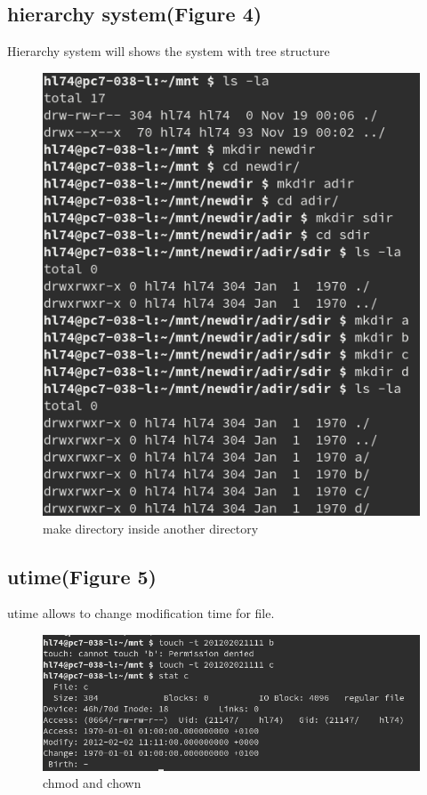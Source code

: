 \documentclass[legalpaper]{article}
\begin{document}
	\subsection*{hierarchy system(Figure 4)}
	Hierarchy system will shows the system with tree structure
	\begin{figure}[H]
	\centering
	\includegraphics[width = \textwidth]{hier}
	\caption{make directory inside another directory}
	\end{figure}
	\subsection*{utime(Figure 5)}
	utime allows to change modification time for file.
	\begin{figure}[H]
	\centering
	\includegraphics[width = \textwidth]{permutime}
	\caption{chmod and chown}
	\end{figure}
\end{document}
